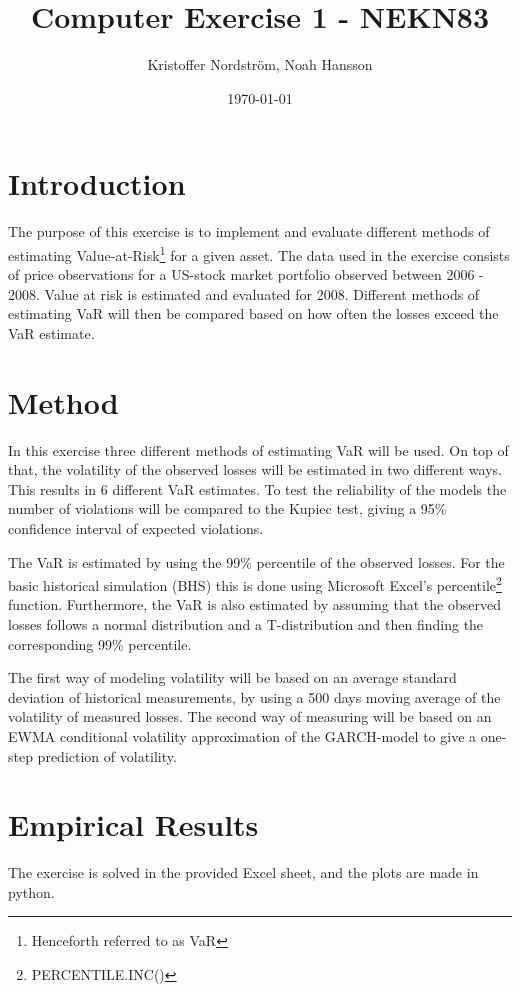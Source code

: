 \documentclass[a4paper]{article}
\title{Computer Exercise 1 - NEKN83}
\author{Kristoffer Nordström, Noah Hansson}
\date{\today}
\begin{document}
\maketitle

\section{Introduction}
The purpose of this exercise is to implement and evaluate different methods of estimating Value-at-Risk\footnote{Henceforth referred to as VaR} for a given asset. The data used in the exercise consists of price observations for a US-stock market portfolio observed between 2006 - 2008. Value at risk is estimated and evaluated for 2008. Different methods of estimating VaR will then be compared based on how often the losses exceed the VaR estimate.

\section{Method}
In this exercise three different methods of estimating VaR will be used. On top of that, the volatility of the observed losses will be estimated in two different ways. This results in 6 different VaR estimates. To test the reliability of the models the number of violations will be compared to the Kupiec test, giving a 95\% confidence interval of expected violations.
   
The VaR is estimated by using the 99\% percentile of the observed losses. For the basic historical simulation (BHS) this is done using Microsoft Excel's percentile\footnote{PERCENTILE.INC()} function. Furthermore, the VaR is also estimated by assuming that the observed losses follows a normal distribution and a T-distribution and then finding the corresponding 99\% percentile.

The first way of modeling volatility will be based on an average standard deviation of historical measurements, by using a 500 days moving average of the volatility of measured losses. The second way of measuring will be based on an EWMA conditional volatility approximation of the GARCH-model to give a one-step prediction of volatility.



\section{Empirical Results}
The exercise is solved in the provided Excel sheet, and the plots are made in python. 
\end{document}
